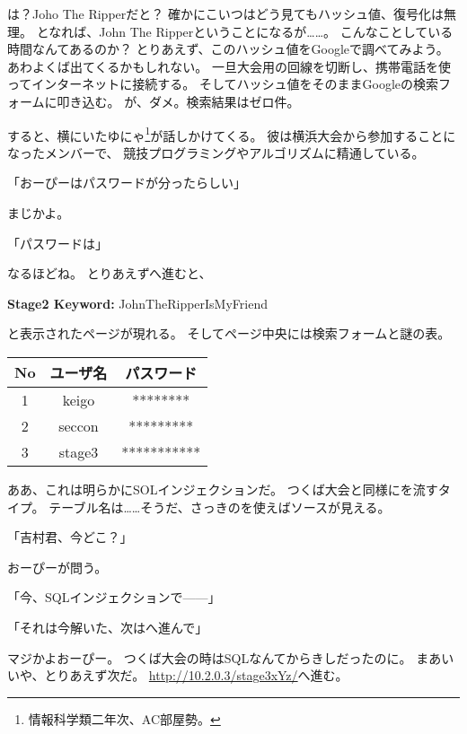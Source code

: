 は？Joho The Ripperだと？
確かにこいつはどう見てもハッシュ値、復号化は無理。
となれば、John The Ripperということになるが……。
こんなことしている時間なんてあるのか？
とりあえず、このハッシュ値をGoogleで調べてみよう。
あわよくば出てくるかもしれない。
一旦大会用の回線を切断し、携帯電話を使ってインターネットに接続する。
そしてハッシュ値をそのままGoogleの検索フォームに叩き込む。
が、ダメ。検索結果はゼロ件。

すると、横にいたゆにゃ\footnote{情報科学類二年次、AC部屋勢。}が話しかけてくる。
彼は横浜大会から参加することになったメンバーで、
競技プログラミングやアルゴリズムに精通している。

「おーぴーはパスワードが分ったらしい」

まじかよ。

「パスワードは」

なるほどね。
とりあえずへ進むと、

\begin{screen}
\centering
\textbf{Stage2 Keyword:} JohnTheRipperIsMyFriend 
\end{screen}

と表示されたページが現れる。
そしてページ中央には検索フォームと謎の表。

\begin{table}[H]
	\centering
	\begin{tabular}{|c|c|c|}
		\hline
		\textbf{No} & \textbf{ユーザ名} & \textbf{パスワード} \\ \hline
		1 & keigo & ******** \\ \hline
		2 & seccon & ********* \\ \hline
		3 & stage3 & *********** \\ \hline
	\end{tabular}
\end{table}

ああ、これは明らかにSOLインジェクションだ。
つくば大会と同様にを流すタイプ。
テーブル名は……そうだ、さっきのを使えばソースが見える。

「吉村君、今どこ？」

おーぴーが問う。

「今、SQLインジェクションで------」

「それは今解いた、次はへ進んで」

マジかよおーぴー。
つくば大会の時はSQLなんてからきしだったのに。
まあいいや、とりあえず次だ。
\url{http://10.2.0.3/stage3xYz/}へ進む。



